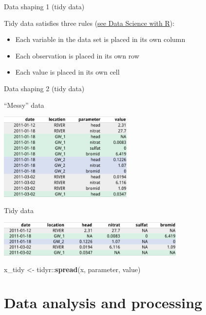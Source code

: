 \documentclass[9pt,ignorenonframetext,]{beamer}
\newenvironment{Shaded}{\begin{snugshade}}{\end{snugshade}}
\newcommand{\KeywordTok}[1]{\textcolor[rgb]{0.13,0.29,0.53}{\textbf{{#1}}}}
\newcommand{\StringTok}[1]{\textcolor[rgb]{0.31,0.60,0.02}{{#1}}}
\newcommand{\NormalTok}[1]{{#1}}
\providecommand{\tightlist}{%
  \setlength{\itemsep}{0pt}\setlength{\parskip}{0pt}}
\begin{document}
\begin{frame}{Data shaping 1 (tidy data)}

Tidy data satisfies three rules
(\href{http://garrettgman.github.io/tidying/}{see Data Science with R}):

\begin{itemize}
\tightlist
\item
  Each variable in the data set is placed in its own column
\item
  Each observation is placed in its own row
\item
  Each value is placed in its own cell
\end{itemize}

\end{frame}

\begin{frame}[fragile]{Data shaping 2 (tidy data)}

``Messy'' data

\includegraphics[width=0.50000\textwidth]{imgPres/data_tidying_table_messy.png}

Tidy data

\includegraphics[width=0.70000\textwidth]{imgPres/data_tidying_table_tidy.png}

\begin{Shaded}
\begin{Highlighting}[]
\NormalTok{x_tidy <-}\StringTok{ }\NormalTok{tidyr::}\KeywordTok{spread}\NormalTok{(x, parameter, value)}
\end{Highlighting}
\end{Shaded}

\end{frame}

\section{Data analysis and
processing}\label{data-analysis-and-processing}
\end{document}
